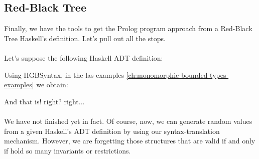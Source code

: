 	\subsection{Red-Black Tree}
	Finally, we have the tools to get the Prolog program approach from a Red-Black Tree Haskell's definition. Let's pull out all the stops.\\\\
	Let's suppose the following Haskell ADT definition:
	
	Using HGBSyntax, in the las examples \ref{ch:monomorphic-bounded-types-examples} we obtain:
	
	And that is! right? right...\\\\
	We have not finished yet in fact. Of course, now, we can generate random values from a given Haskell's ADT definition by using our syntax-translation mechanism. However, we are forgetting those structures that are valid if and only if hold so many invariants or restrictions.
